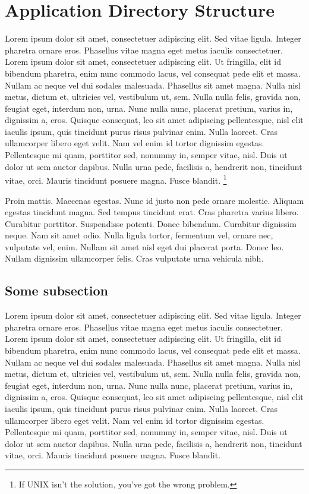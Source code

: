 \documentclass[nochapterpage,nopartpage,numbersubsubsec,bigchapter,colorback,accentcolor=tud9c]{tudreport}
\begin{document}
  \section{Application Directory Structure}
  \label{sec:tech:intro:dirs}

    Lorem ipsum dolor sit amet, consectetuer adipiscing elit. Sed vitae ligula. Integer pharetra ornare eros. Phasellus vitae magna eget metus iaculis consectetuer. Lorem ipsum dolor sit amet, consectetuer adipiscing elit. Ut fringilla, elit id bibendum pharetra, enim nunc commodo lacus, vel consequat pede elit et massa. Nullam ac neque vel dui sodales malesuada. Phasellus sit amet magna. Nulla nisl metus, dictum et, ultricies vel, vestibulum ut, sem. Nulla nulla felis, gravida non, feugiat eget, interdum non, urna. Nunc nulla nunc, placerat pretium, varius in, dignissim a, eros. Quisque consequat, leo sit amet adipiscing pellentesque, nisl elit iaculis ipsum, quis tincidunt purus risus pulvinar enim. Nulla laoreet. Cras ullamcorper libero eget velit. Nam vel enim id tortor dignissim egestas. Pellentesque mi quam, porttitor sed, nonummy in, semper vitae, nisl. Duis ut dolor ut sem auctor dapibus. Nulla urna pede, facilisis a, hendrerit non, tincidunt vitae, orci. Mauris tincidunt posuere magna. Fusce blandit.%
    \footnote{If UNIX isn't the solution, you've got the wrong problem.}

    Proin mattis. Maecenas egestas. Nunc id justo non pede ornare molestie. Aliquam egestas tincidunt magna. Sed tempus tincidunt erat. Cras pharetra varius libero. Curabitur porttitor. Suspendisse potenti. Donec bibendum. Curabitur dignissim neque. Nam sit amet odio. Nulla ligula tortor, fermentum vel, ornare nec, vulputate vel, enim. Nullam sit amet nisl eget dui placerat porta. Donec leo. Nullam dignissim ullamcorper felis. Cras vulputate urna vehicula nibh.

  \subsection{Some subsection}
  \label{sec:tech:intro:dirs:subsection}

    Lorem ipsum dolor sit amet, consectetuer adipiscing elit. Sed vitae ligula. Integer pharetra ornare eros. Phasellus vitae magna eget metus iaculis consectetuer. Lorem ipsum dolor sit amet, consectetuer adipiscing elit. Ut fringilla, elit id bibendum pharetra, enim nunc commodo lacus, vel consequat pede elit et massa. Nullam ac neque vel dui sodales malesuada. Phasellus sit amet magna. Nulla nisl metus, dictum et, ultricies vel, vestibulum ut, sem. Nulla nulla felis, gravida non, feugiat eget, interdum non, urna. Nunc nulla nunc, placerat pretium, varius in, dignissim a, eros. Quisque consequat, leo sit amet adipiscing pellentesque, nisl elit iaculis ipsum, quis tincidunt purus risus pulvinar enim. Nulla laoreet. Cras ullamcorper libero eget velit. Nam vel enim id tortor dignissim egestas. Pellentesque mi quam, porttitor sed, nonummy in, semper vitae, nisl. Duis ut dolor ut sem auctor dapibus. Nulla urna pede, facilisis a, hendrerit non, tincidunt vitae, orci. Mauris tincidunt posuere magna. Fusce blandit.
\end{document}
